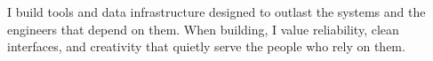 
I build tools and data infrastructure designed to outlast the systems and the engineers that depend on them. When building, I value reliability, clean interfaces, and creativity that quietly serve the people who rely on them.
